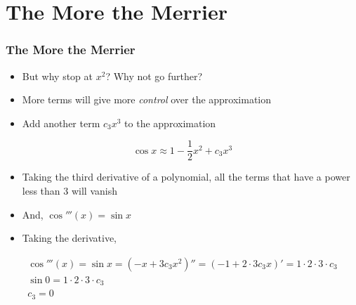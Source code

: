 \documentclass{beamer}
\begin{document}

\section{The More the Merrier}

\begin{frame}
  \frametitle{The More the Merrier}
  \begin{itemize}
    \item But why stop at \( x^2 \)? Why not go further?
    \item More terms will give more \textit{control} over the approximation
    \item Add another term \( c_3x^3 \) to the approximation
  \end{itemize}
  \begin{equation*}
    \cos x \approx 1 - \frac{1}{2}x^2 + c_3x^3
  \end{equation*}
  \begin{itemize}
    \item Taking the third derivative of a polynomial, all the terms that have a power less than 3 will vanish
    \item And, \( \cos'''(x) = \sin x \)
    \item Taking the derivative,
  \end{itemize}
  \begin{gather*}
    \cos'''(x) = \sin x = \left(-x + 3c_3x^2\right)'' = \left(-1 + 2 \cdot 3c_3x\right)' = 1 \cdot 2 \cdot 3 \cdot c_3 \\
    \sin 0 = 1 \cdot 2 \cdot 3 \cdot c_3 \\
    c_3 = 0
  \end{gather*}
\end{frame}
\end{document}
